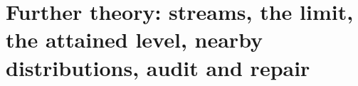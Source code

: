 \documentclass{article}
\theoremstyle{plain}
\theoremstyle{definition}
\theoremstyle{remark}
\begin{document}
\setlength{\bibsep}{1pt plus 0.5pt}%



\appendix
\onecolumn
\small %
\setcounter{topnumber}{4}\setcounter{bottomnumber}{3}\setcounter{totalnumber}{6}\renewcommand{\topfraction}{0.9}
\renewcommand{\bottomfraction}{0.8}\renewcommand{\textfraction}{0.07}\renewcommand{\floatpagefraction}{0.85}
\setlength{\textfloatsep}{10pt plus 2pt minus 4pt}\setlength{\floatsep}{8pt plus 2pt minus 2pt}
\setlength{\intextsep}{8pt plus 2pt minus 2pt}
\makeatletter
\setlength{\@fptop}{0pt}\setlength{\@fpbot}{0pt plus 1fil}
\renewenvironment{table}[1][]{\@float{table}[!htbp]\let\small\footnotesize}{\end@float}
\renewenvironment{table*}[1][]{\@float{table}[!htbp]\let\small\footnotesize}{\end@float}
\renewenvironment{figure}[1][]{\@float{figure}[!htbp]}{\end@float}
\renewenvironment{figure*}[1][]{\@float{figure}[!htbp]}{\end@float}
\makeatother

\section{Further theory: streams, the limit, the attained level, nearby distributions, audit and repair}
\label{app:theory}
\end{document}
